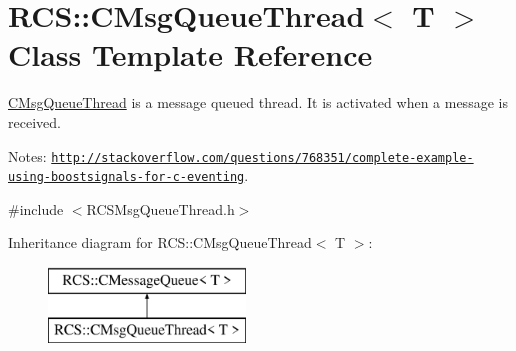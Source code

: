 \hypertarget{classRCS_1_1CMsgQueueThread}{\section{R\-C\-S\-:\-:C\-Msg\-Queue\-Thread$<$ T $>$ Class Template Reference}
\label{classRCS_1_1CMsgQueueThread}
}


\hyperlink{classRCS_1_1CMsgQueueThread}{C\-Msg\-Queue\-Thread} is a message queued thread. It is activated when a message is received. \par
 Notes\-: \href{http://stackoverflow.com/questions/768351/complete-example-using-boostsignals-for-c-eventing}{\tt http\-://stackoverflow.\-com/questions/768351/complete-\/example-\/using-\/boostsignals-\/for-\/c-\/eventing}.  




{\ttfamily \#include $<$R\-C\-S\-Msg\-Queue\-Thread.\-h$>$}

Inheritance diagram for R\-C\-S\-:\-:C\-Msg\-Queue\-Thread$<$ T $>$\-:\begin{figure}[H]
\begin{center}
\leavevmode
\includegraphics[height=2.000000cm]{classRCS_1_1CMsgQueueThread}
\end{center}
\end{figure}
